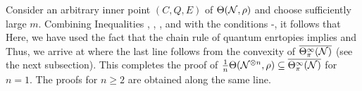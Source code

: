 \documentclass[journal]{IEEEtran}
\begin{document}
\begin{lmm}
\begin{lmm}
Consider an arbitrary inner point $(C,Q,E)$ of $\Theta({\mathcal N},\rho)$ and choose sufficiently large $m$.
Combining Inequalities , , ,  and  with the conditions -,
 it follows that
Here, we have used the fact that
the chain rule of quantum enrtopies implies 
and
Thus, we arrive at
where the last line follows from the convexity of $\overline{\Theta_{\pi}^{\infty}({\mathcal N})}$ (see the next subsection).
This completes the proof of $\frac{1}{n}\Theta({\mathcal N}^{\otimes n},\rho)\subseteq\overline{\Theta_{\pi}^{\infty}({\mathcal N})}$ for $n=1$.
The proofs for $n\geq2$ are obtained along the same line.
\QED





\end{lmm}
\end{lmm}
\end{document}
